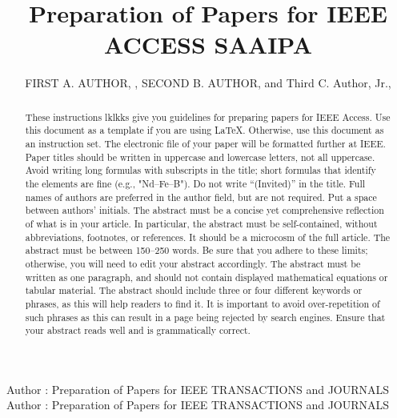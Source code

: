 \documentclass{ieeeaccess}
\begin{document}

\title{Preparation of Papers for IEEE ACCESS SAAIPA}
\author{\uppercase{First A. Author}, ,
    \uppercase{Second B. Author}, and Third C. Author,
    Jr.,
    }

\address[1]{National Institute of Standards and
    Technology, Boulder, CO 80305 USA (e-mail: author@boulder.nist.gov)}
\address[2]{Department of Physics, Colorado State University, Fort Collins,
    CO 80523 USA (e-mail: author@lamar.colostate.edu)}
\address[3]{Electrical Engineering Department, University of Colorado, Boulder, CO
    80309 USA}

\markboth
{Author \headeretal: Preparation of Papers for IEEE TRANSACTIONS and JOURNALS}
{Author \headeretal: Preparation of Papers for IEEE TRANSACTIONS and JOURNALS}



\begin{abstract}
    These instructions lklkks give you guidelines for preparing papers for
    IEEE Access. Use this document as a template if you are
    using \LaTeX. Otherwise, use this document as an
    instruction set. The electronic file of your paper will be formatted further
    at IEEE. Paper titles should be written in uppercase and lowercase letters,
    not all uppercase. Avoid writing long formulas with subscripts in the title;
    short formulas that identify the elements are fine (e.g., "Nd--Fe--B"). Do
    not write ``(Invited)'' in the title. Full names of authors are preferred in
    the author field, but are not required. Put a space between authors'
    initials. The abstract must be a concise yet comprehensive reflection of
    what is in your article. In particular, the abstract must be self-contained,
    without abbreviations, footnotes, or references. It should be a microcosm of
    the full article. The abstract must be between 150--250 words. Be sure that
    you adhere to these limits; otherwise, you will need to edit your abstract
    accordingly. The abstract must be written as one paragraph, and should not
    contain displayed mathematical equations or tabular material. The abstract
    should include three or four different keywords or phrases, as this will
    help readers to find it. It is important to avoid over-repetition of such
    phrases as this can result in a page being rejected by search engines.
    Ensure that your abstract reads well and is grammatically correct.
\end{abstract}
\end{document}
